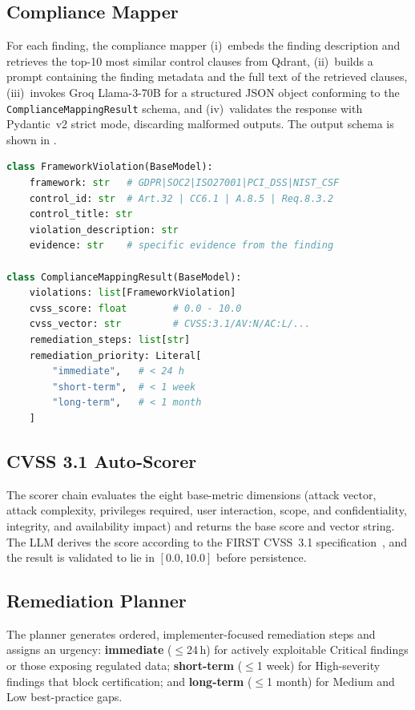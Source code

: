 \documentclass[conference]{IEEEtran}
\begin{document}
\subsection{Compliance Mapper}
For each finding, the compliance mapper (i)~embeds the finding description and
retrieves the top-10 most similar control clauses from Qdrant, (ii)~builds a
prompt containing the finding metadata and the full text of the retrieved
clauses, (iii)~invokes Groq Llama-3-70B for a structured JSON object conforming
to the \texttt{ComplianceMappingResult} schema, and (iv)~validates the response
with Pydantic~v2 strict mode, discarding malformed outputs. The output schema is
shown in .

\begin{lstlisting}[language=Python, label={lst:schema},
  caption={Pydantic schemas for compliance mapping output.}]
class FrameworkViolation(BaseModel):
    framework: str   # GDPR|SOC2|ISO27001|PCI_DSS|NIST_CSF
    control_id: str  # Art.32 | CC6.1 | A.8.5 | Req.8.3.2
    control_title: str
    violation_description: str
    evidence: str    # specific evidence from the finding

class ComplianceMappingResult(BaseModel):
    violations: list[FrameworkViolation]
    cvss_score: float        # 0.0 - 10.0
    cvss_vector: str         # CVSS:3.1/AV:N/AC:L/...
    remediation_steps: list[str]
    remediation_priority: Literal[
        "immediate",   # < 24 h
        "short-term",  # < 1 week
        "long-term",   # < 1 month
    ]
\end{lstlisting}

\subsection{CVSS 3.1 Auto-Scorer}
The scorer chain evaluates the eight base-metric dimensions (attack vector,
attack complexity, privileges required, user interaction, scope, and
confidentiality, integrity, and availability impact) and returns the base score
and vector string. The LLM derives the score according to the FIRST CVSS~3.1
specification~\cite{CVSS31}, and the result is validated to lie in $[0.0, 10.0]$
before persistence.

\subsection{Remediation Planner}
The planner generates ordered, implementer-focused remediation steps and assigns
an urgency: \textbf{immediate} ($\leq$24\,h) for actively exploitable Critical
findings or those exposing regulated data; \textbf{short-term} ($\leq$1 week) for
High-severity findings that block certification; and \textbf{long-term}
($\leq$1 month) for Medium and Low best-practice gaps.
\end{document}
